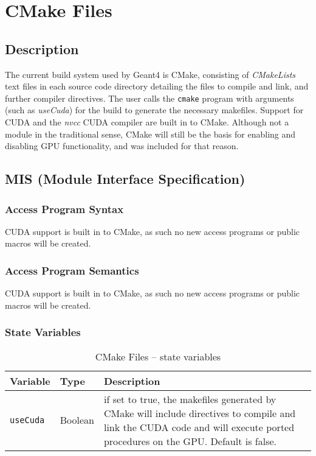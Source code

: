 \documentclass[12pt]{article}
\begin{document}
\section{CMake Files}
\subsection{Description}
The current build system used by Geant4 is CMake, consisting of \emph{CMakeLists} text files in each source code directory detailing the files to compile and link, and further compiler directives. The user calls the \texttt{cmake} program with arguments (such as \emph{useCuda}) for the build to generate the necessary makefiles. Support for CUDA and the \emph{nvcc} CUDA compiler are built in to CMake. Although not a module in the traditional sense, CMake will still be the basis for enabling and disabling GPU functionality, and was included for that reason.

\subsection{MIS (Module Interface Specification)}
\subsubsection{Access Program Syntax}%
CUDA support is built in to CMake, as such no new access programs or public macros will be created.

\subsubsection{Access Program Semantics}%
CUDA support is built in to CMake, as such no new access programs or public macros will be created.

\subsubsection{State Variables}%
\begin{table}[h]
\caption{CMake Files -- state variables}\label{Table_CMakeStateVariables}
\begin{tabularx}{\textwidth}{p{}p{}p{}}
\toprule
\bf Variable & \bf Type & \bf Description\\\midrule
\texttt{useCuda} & Boolean & if set to true, the makefiles generated by CMake will include directives to compile and link the CUDA code and will execute ported procedures on the GPU. Default is false.\\
\bottomrule
\end{tabularx}
\end{table}
\end{document}
